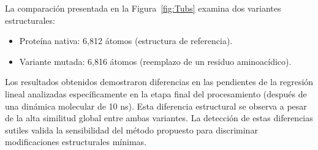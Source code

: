 	
	La comparaci\'{o}n presentada en la Figura~\ref{fig:Tubs} examina dos variantes estructurales:
	\begin{itemize}
		\item Prote\'{i}na nativa: 6,812 \'{a}tomos (estructura de referencia).
		\item Variante mutada: 6,816 \'{a}tomos (reemplazo de un residuo aminoac\'{i}dico).
	\end{itemize}
	
	Los resultados obtenidos demostraron diferencias en las pendientes de la regresi\'{o}n lineal analizadas espec\'{i}ficamente en la etapa final del procesamiento (despu\'{e}s de una din\'{a}mica molecular de 10 ns). Esta diferencia estructural se observa a pesar de la alta similitud global entre ambas variantes.
	La detecci\'{o}n de estas diferencias sutiles valida la sensibilidad del m\'{e}todo propuesto para discriminar modificaciones estructurales m\'{i}nimas.
	
